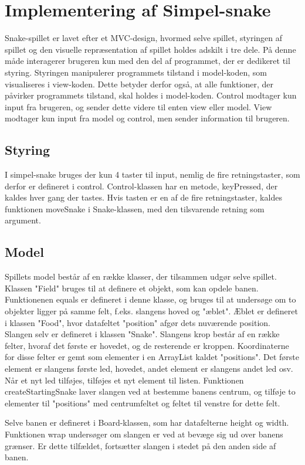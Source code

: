 \documentclass{report}
\begin{document}
\section{Implementering af Simpel-snake}
Snake-spillet er lavet efter et MVC-design, hvormed selve spillet, styringen af spillet og den visuelle repræsentation af spillet holdes adskilt i tre dele. På denne måde interagerer brugeren kun med den del af programmet, der er dedikeret til styring. Styringen manipulerer programmets tilstand i model-koden, som visualiseres i view-koden. Dette betyder derfor også, at alle funktioner, der påvirker programmets tilstand, skal holdes i model-koden. Control modtager kun input fra brugeren, og sender dette videre til enten view eller model. View modtager kun input fra model og control, men sender information til brugeren. 

\subsection{Styring}
I simpel-snake bruges der kun 4 taster til input, nemlig de fire retningstaster, som derfor er defineret i control. Control-klassen har en metode, keyPressed, der kaldes hver gang der tastes. Hvis tasten er en af de fire retningstaster, kaldes funktionen moveSnake i Snake-klassen, med den tilsvarende retning som argument.

\subsection{Model}
Spillets model består af en række klasser, der tilsammen udgør selve spillet.
Klassen "Field" bruges til at definere et objekt, som kan opdele banen. Funktionenen equals er defineret i denne klasse, og bruges til at undersøge om to objekter ligger på samme felt, f.eks. slangens hoved og "æblet". Æblet er defineret i klassen "Food", hvor datafeltet "position" afgør dets nuværende position. 
Slangen selv er defineret i klassen "Snake". Slangens krop består af en række felter, hvoraf det første er hovedet, og de resterende er kroppen. Koordinaterne for disse felter er gemt som elementer i en ArrayList kaldet "positions". Det første element er slangens første led, hovedet, andet element er slangens andet led osv. Når et nyt led tilføjes, tilføjes et nyt element til listen. Funktionen createStartingSnake laver slangen ved at bestemme banens centrum, og tilføje to elementer til "positions" med centrumfeltet og feltet til venstre for dette felt.

Selve banen er defineret i Board-klassen, som har datafelterne height og width. Funktionen wrap undersøger om slangen er ved at bevæge sig ud over banens grænser. Er dette tilfældet, fortsætter slangen i stedet på den anden side af banen.
\end{document}
